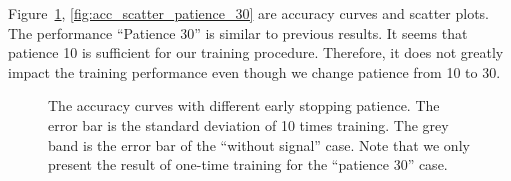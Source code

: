 \documentclass[12pt]{article}
\begin{document}
            Figure~\ref{fig:acc_curve_patience_30}, \ref{fig:acc_scatter_patience_30} are accuracy curves and scatter plots. The performance ``Patience 30'' is similar to previous results. It seems that patience 10 is sufficient for our training procedure. Therefore, it does not greatly impact the training performance even though we change patience from 10 to 30.
            \begin{figure}[htpb]
                \centering
                \caption{The accuracy curves with different early stopping patience. The error bar is the standard deviation of 10 times training. The grey band is the error bar of the ``without signal'' case. Note that we only present the result of one-time training for the ``patience 30'' case.}
                \label{fig:acc_curve_patience_30}
            \end{figure}
\end{document}
